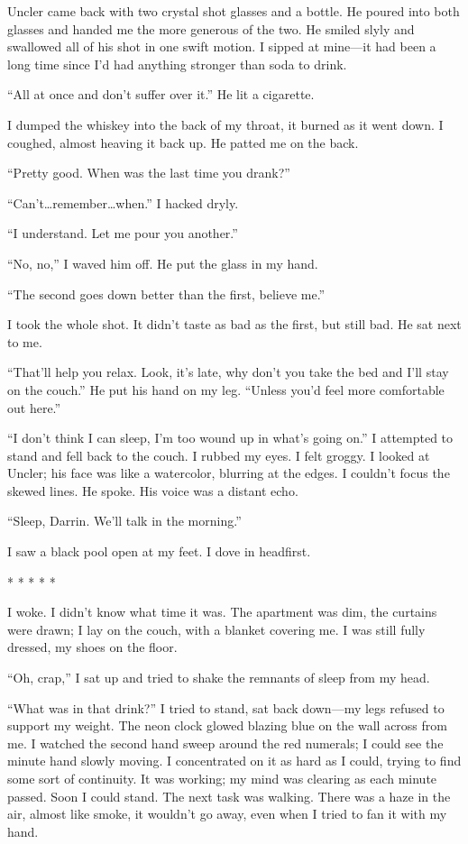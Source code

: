 \documentclass[
]{article}
\begin{document}
Uncler came back with two crystal shot glasses and a bottle. He poured
into both glasses and handed me the more generous of the two. He smiled
slyly and swallowed all of his shot in one swift motion. I sipped at
mine---it had been a long time since I'd had anything stronger than soda
to drink.

``All at once and don't suffer over it.'' He lit a cigarette.

I dumped the whiskey into the back of my throat, it burned as it went
down. I coughed, almost heaving it back up. He patted me on the back.

``Pretty good. When was the last time you drank?''

``Can't\ldots remember\ldots when.'' I hacked dryly.

``I understand. Let me pour you another.''

``No, no,'' I waved him off. He put the glass in my hand.

``The second goes down better than the first, believe me.''

I took the whole shot. It didn't taste as bad as the first, but still
bad. He sat next to me.

``That'll help you relax. Look, it's late, why don't you take the bed
and I'll stay on the couch.'' He put his hand on my leg. ``Unless you'd
feel more comfortable out here.''

``I don't think I can sleep, I'm too wound up in what's going on.'' I
attempted to stand and fell back to the couch. I rubbed my eyes. I felt
groggy. I looked at Uncler; his face was like a watercolor, blurring at
the edges. I couldn't focus the skewed lines. He spoke. His voice was a
distant echo.

``Sleep, Darrin. We'll talk in the morning.''

I saw a black pool open at my feet. I dove in headfirst.

* * * * *

I woke. I didn't know what time it was. The apartment was dim, the
curtains were drawn; I lay on the couch, with a blanket covering me. I
was still fully dressed, my shoes on the floor.

``Oh, crap,'' I sat up and tried to shake the remnants of sleep from my
head.

``What was in that drink?'' I tried to stand, sat back down---my legs
refused to support my weight. The neon clock glowed blazing blue on the
wall across from me. I watched the second hand sweep around the red
numerals; I could see the minute hand slowly moving. I concentrated on
it as hard as I could, trying to find some sort of continuity. It was
working; my mind was clearing as each minute passed. Soon I could stand.
The next task was walking. There was a haze in the air, almost like
smoke, it wouldn't go away, even when I tried to fan it with my hand.
\end{document}
